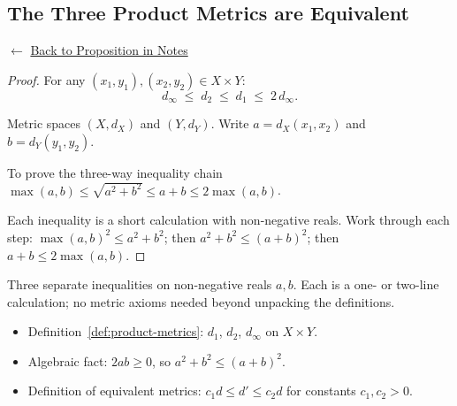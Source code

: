
\subsection*{The Three Product Metrics are Equivalent}
\label{prf:product-metrics-equiv}

\begin{remark*}[Return]
$\leftarrow$ \hyperref[prop:product-metrics-equiv]{Back to Proposition in Notes}
\end{remark*}

\begin{proof}
\Claim For any $(x_1,y_1), (x_2,y_2) \in X \times Y$:
\[
d_\infty \;\le\; d_2 \;\le\; d_1 \;\le\; 2\, d_\infty.
\]

\Given Metric spaces $(X,d_X)$ and $(Y,d_Y)$.
Write $a = d_X(x_1,x_2)$ and $b = d_Y(y_1,y_2)$.

\Goal To prove the three-way inequality chain
$\max(a,b) \le \sqrt{a^2+b^2} \le a+b \le 2\max(a,b)$.

\Strategy Each inequality is a short calculation with non-negative reals.
Work through each step: $\max(a,b)^2 \le a^2+b^2$; then $a^2+b^2 \le (a+b)^2$;
then $a+b \le 2\max(a,b)$.


\end{proof}

\begin{remark*}
Three separate inequalities on non-negative reals $a, b$.
Each is a one- or two-line calculation; no metric axioms needed
beyond unpacking the definitions.
\end{remark*}

\begin{remark*}[Dependencies]
\begin{itemize}
  \item Definition~\ref{def:product-metrics}: $d_1$, $d_2$, $d_\infty$ on $X \times Y$.
  \item Algebraic fact: $2ab \ge 0$, so $a^2 + b^2 \le (a+b)^2$.
  \item Definition of equivalent metrics: $c_1 d \le d' \le c_2 d$ for constants $c_1, c_2 > 0$.
\end{itemize}
\end{remark*}
